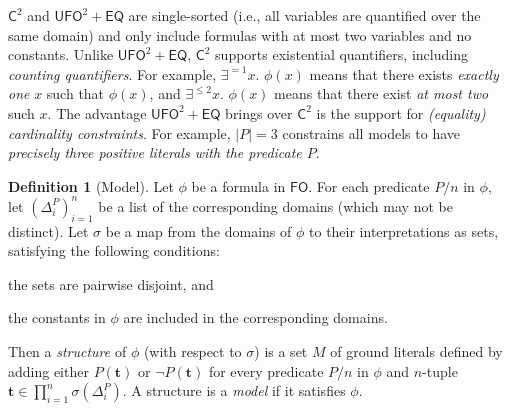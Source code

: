 \documentclass[letterpaper]{article} %
\theoremstyle{remark}
\theoremstyle{definition}
\newtheorem{definition}{Definition}
\newcommand{\Ctwo}{$\mathsf{C}^{2}$}
\newcommand{\FO}{$\mathsf{FO}$}
\newcommand{\UFO}{$\mathsf{UFO}^{2} + \mathsf{EQ}$}
\begin{document}
\Ctwo{} and \UFO{} are single-sorted (i.e., all variables are quantified over
the same domain) and only include formulas with at most two variables and no
constants. Unlike \UFO{}, \Ctwo{} supports existential quantifiers, including
\emph{counting quantifiers}. For example, $\exists^{=1} x\text{. }\phi(x)$ means
that there exists \emph{exactly one} $x$ such that $\phi(x)$, and
$\exists^{\le 2} x\text{. }\phi(x)$ means that there exist \emph{at most two}
such $x$. The advantage \UFO{} brings over \Ctwo{} is the support for
\emph{(equality) cardinality constraints}. For example, $|P| = 3$ constrains all
models to have \emph{precisely three positive literals with the predicate $P$}.

\begin{definition}[Model]\label{def:model}
  Let $\phi$ be a formula in \FO{}. For each predicate $P/n$ in $\phi$, let
  ${(\Delta_{i}^{P})}_{i=1}^{n}$ be a list of the corresponding domains (which
  may not be distinct). Let $\sigma$ be a map from the domains of $\phi$ to
  their interpretations as sets, satisfying the following conditions:
  \begin{enumerate*}[label=(\roman*)]
    \item the sets are pairwise disjoint, and
    \item the constants in $\phi$ are included in the corresponding domains.
  \end{enumerate*}
  Then a \emph{structure} of $\phi$ (with respect to $\sigma$) is a set $M$ of
  ground literals defined by adding either $P(\mathbf{t})$ or
  $\neg P(\mathbf{t})$ for every predicate $P/n$ in $\phi$ and $n$-tuple
  $\mathbf{t} \in \prod_{i=1}^{n} \sigma(\Delta_{i}^{P})$. A structure is a
  \emph{model} if it satisfies $\phi$.
\end{definition}
\end{document}
